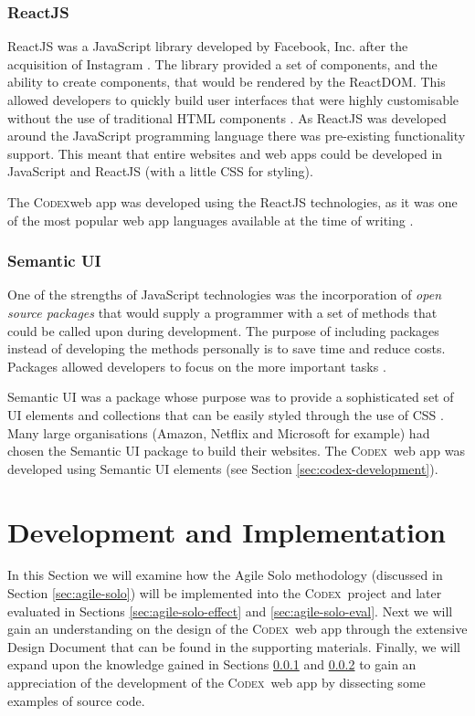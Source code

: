 \documentclass[final]{cmpreport}
\newcommand{\Codex}{\textsc{Codex}}
\begin{document}
			\subsubsection{ReactJS} \label{sec:react-js}
			ReactJS was a JavaScript library developed by Facebook, Inc. after the acquisition of Instagram \citep{ReactJSOfficial}. The library provided a set of components, and the ability to create components, that would be rendered by the ReactDOM. This allowed developers to quickly build user interfaces that were highly customisable without the use of traditional HTML components \citep{MasteringReact}. As ReactJS was developed around the JavaScript programming language there was pre-existing functionality support. This meant that entire websites and web apps could be developed in JavaScript and ReactJS (with a little CSS for styling). 
			
			The \Codex web app was developed using the ReactJS technologies, as it was one of the most popular web app languages available at the time of writing \citep{ReactJSPopularity}.  
			
			\subsubsection{Semantic UI} \label{sec:semantic-ui}
			One of the strengths of JavaScript technologies was the incorporation of \emph{open source packages} that would supply a programmer with a set of methods that could be called upon during development. The purpose of including packages instead of developing the methods personally is to save time and reduce costs. Packages allowed developers to focus on the more important tasks \citep{JavaScriptGuide}.
			
			Semantic UI was a package whose purpose was to provide a sophisticated set of UI elements and collections that can be easily styled through the use of CSS \citep{SemanticUI}. Many large organisations (Amazon, Netflix and Microsoft for example) had chosen the Semantic UI package to build their websites. The \Codex \ web app was developed using Semantic UI elements (see Section \ref{sec:codex-development}).
			
			
	\section{Development and Implementation} \label{sec:dev-and-imp}
	In this Section we will examine how the Agile Solo methodology (discussed in Section \ref{sec:agile-solo}) will be implemented into the \Codex \ project and later evaluated in Sections \ref{sec:agile-solo-effect} and \ref{sec:agile-solo-eval}. Next we will gain an understanding on the design of the \Codex \ web app through the extensive Design Document that can be found in the supporting materials. Finally, we will expand upon the knowledge gained in Sections \ref{sec:react-js} and \ref{sec:semantic-ui} to gain an appreciation of the development of the \Codex \ web app by dissecting some examples of source code.
	
\end{document}
